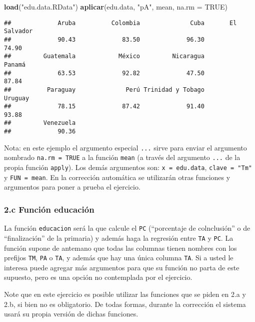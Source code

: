 \documentclass[]{article}
\newenvironment{Shaded}{}{}
\newcommand{\KeywordTok}[1]{\textcolor[rgb]{0.00,0.44,0.13}{\textbf{{#1}}}}
\newcommand{\DataTypeTok}[1]{\textcolor[rgb]{0.56,0.13,0.00}{{#1}}}
\newcommand{\StringTok}[1]{\textcolor[rgb]{0.25,0.44,0.63}{{#1}}}
\newcommand{\OtherTok}[1]{\textcolor[rgb]{0.00,0.44,0.13}{{#1}}}
\newcommand{\NormalTok}[1]{{#1}}
\begin{document}
\begin{Shaded}
\begin{Highlighting}[]
\KeywordTok{load}\NormalTok{(}\StringTok{"edu.data.RData"}\NormalTok{)}
\KeywordTok{aplicar}\NormalTok{(edu.data, }\StringTok{"pA"}\NormalTok{, mean, }\DataTypeTok{na.rm =} \OtherTok{TRUE}\NormalTok{)}
\end{Highlighting}
\end{Shaded}

\begin{verbatim}
##             Aruba          Colombia              Cuba       El Salvador 
##             90.43             83.50             96.30             74.90 
##         Guatemala            México         Nicaragua            Panamá 
##             63.53             92.82             47.50             87.84 
##          Paraguay              Perú Trinidad y Tobago           Uruguay 
##             78.15             87.42             91.40             93.88 
##         Venezuela 
##             90.36
\end{verbatim}

Nota: en este ejemplo el argumento especial \texttt{...} sirve para
enviar el argumento nombrado \texttt{na.rm = TRUE} a la función
\texttt{mean} (a través del argumento \texttt{...} de la propia función
\texttt{apply}). Los demás argumentos son: \texttt{x = edu.data},
\texttt{clave = "Tm"} y \texttt{FUN = mean}. En la corrección automática
se utilizarán otras funciones y argumentos para poner a prueba el
ejercicio.

\subsubsection{2.c Función educación}

La función \texttt{educacion} será la que calcule el \texttt{PC}
(``porcentaje de colnclusión'' o de ``finalización'' de la primaria) y
además haga la regresión entre \texttt{TA} y \texttt{PC}. La función
supone de antemano que todas las columnas tienen nombres con los
prefijos \texttt{TM}, \texttt{PA} o \texttt{TA}, y además que hay una
única columna \texttt{TA}. Si a usted le interesa puede agregar más
argumentos para que su función no parta de este supuesto, pero es una
opción no contemplada por el ejercicio.

Note que en este ejercicio es posible utilizar las funciones que se
piden en 2.a y 2.b, si bien no es obligatorio. De todas formas, durante
la corrección el sistema usará su propia versión de dichas funciones.
\end{document}

